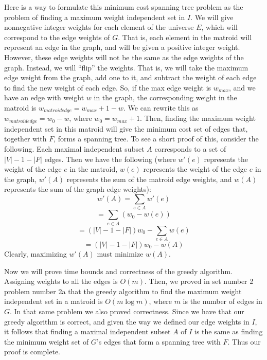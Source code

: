 \documentclass{article}
\begin{document}
\begin{description}
         Here is a way to formulate this minimum cost spanning tree problem as the
        problem of finding a maximum weight independent set in $I$. We will
        give nonnegative integer
        weights for each element of the universe $E$, which will correspond to the
        edge weights of $G$. That is, each element in the matroid will
        represent an edge in the graph, and will be given a positive integer weight.
        However, these edge weights will not be the
        same as the edge weights of the graph. Instead, we will ``flip'' the
        weights. That is, we will take the maximum edge weight from the graph,
        add one to it,
        and subtract the weight of each edge to find the new weight of each
        edge. So, if the max edge weight is $w_{max}$, and we have an edge with
        weight $w$ in the graph, the corresponding weight in the matroid is $w_{matroid edge} =
        w_{max} + 1 - w$. We can rewrite this as $w_{matroid edge} = w_0 - w$, where
        $w_0 = w_{max} + 1$.
        Then, finding the maximum weight independent set in this
        matroid will give the minimum cost set of edges that, together with $F$,
        forms a spanning tree.
        To see a short proof of this, consider the
        following. Each maximal independent subset $A$ corresponds to a set of
        $|V| - 1 - |F|$ edges. Then we have the following (where $w'(e)$
        represents the weight of the edge $e$ in the matroid, $w(e)$ represents the
        weight of the edge $e$ in the graph, $w'(A)$ represents the sum of the
        matroid edge weights, and $w(A)$ represents the sum of the graph edge
        weights):
        \[ w'(A) = \sum_{e \in A} w'(e) \]
        \[ = \sum_{e \in A} (w_0 - w(e)) \]
        \[ = (|V| - 1 - |F|)w_0 - \sum_{e \in A} w(e) \]
        \[ = (|V| - 1 - |F|)w_0 - w(A) \]
        Clearly, maximizing $w'(A)$ must minimize $w(A)$.

        Now we will prove time bounds and correctness of the greedy algorithm.
        Assigning weights to all the edges is $O(m)$. Then, we proved in set
        number 2 problem number 2a that the greedy algorithm to find the maximum weight
        independent set in a matroid is $O(m \log m)$, where $m$ is the number
        of edges in $G$. In that same problem we also proved correctness. Since
        we have that our greedy algorithm is correct, and given the way we
        defined our edge weights in $I$, it follows that finding a
        maximal independent subset $A$ of $I$ is the same as finding the minimum
        weight set of $G$'s edges that form a spanning tree with $F$.
        Thus our proof is complete.
\end{description}
\newpage
\end{document}
